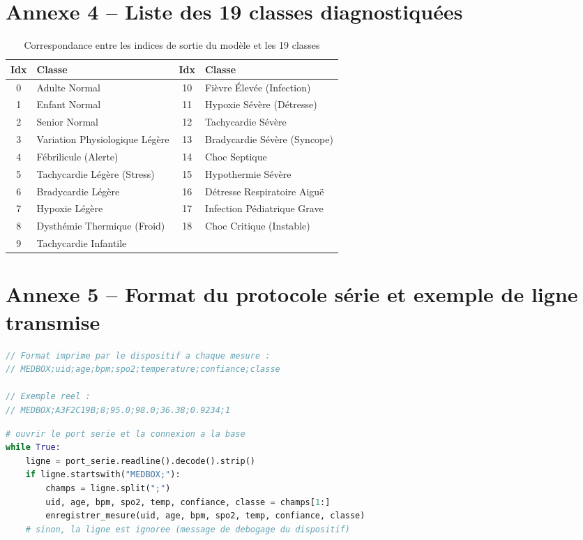 \documentclass[12pt,a4paper]{report}
\begin{document}
\section{Annexe 4 -- Liste des 19 classes diagnostiquées}
\begin{table}[H]
\centering
\small
\begin{tabular}{clcl}
\toprule
Idx & Classe & Idx & Classe \\
\midrule
0 & Adulte Normal & 10 & Fièvre Élevée (Infection) \\
1 & Enfant Normal & 11 & Hypoxie Sévère (Détresse) \\
2 & Senior Normal & 12 & Tachycardie Sévère \\
3 & Variation Physiologique Légère & 13 & Bradycardie Sévère (Syncope) \\
4 & Fébrilicule (Alerte) & 14 & Choc Septique \\
5 & Tachycardie Légère (Stress) & 15 & Hypothermie Sévère \\
6 & Bradycardie Légère & 16 & Détresse Respiratoire Aiguë \\
7 & Hypoxie Légère & 17 & Infection Pédiatrique Grave \\
8 & Dysthémie Thermique (Froid) & 18 & Choc Critique (Instable) \\
9 & Tachycardie Infantile & & \\
\bottomrule
\end{tabular}
\caption{Correspondance entre les indices de sortie du modèle et les 19 classes}
\end{table}

\section{Annexe 5 -- Format du protocole série et exemple de ligne transmise}
\begin{lstlisting}[language=C++, basicstyle=\ttfamily\footnotesize]
// Format imprime par le dispositif a chaque mesure :
// MEDBOX;uid;age;bpm;spo2;temperature;confiance;classe

// Exemple reel :
// MEDBOX;A3F2C19B;8;95.0;98.0;36.38;0.9234;1
\end{lstlisting}

\begin{lstlisting}[language=Python, caption={Boucle d'ecoute simplifiee du pont Python}]
# ouvrir le port serie et la connexion a la base
while True:
    ligne = port_serie.readline().decode().strip()
    if ligne.startswith("MEDBOX;"):
        champs = ligne.split(";")
        uid, age, bpm, spo2, temp, confiance, classe = champs[1:]
        enregistrer_mesure(uid, age, bpm, spo2, temp, confiance, classe)
    # sinon, la ligne est ignoree (message de debogage du dispositif)
\end{lstlisting}
\end{document}

